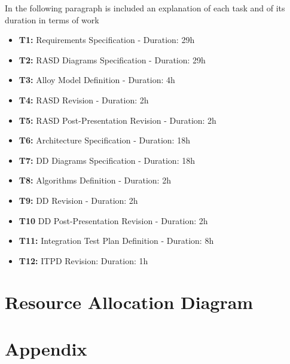 \documentclass[11pt,titlepage]{article} %
\begin{document}
In the following paragraph is included an explanation of each task and of its duration in terms of work
\begin{itemize}
 \item \textbf{T1:} Requirements Specification - Duration: 29h
 \item \textbf{T2:} RASD Diagrams Specification - Duration: 29h
 \item \textbf{T3:} Alloy Model Definition - Duration: 4h
 \item \textbf{T4:} RASD Revision - Duration: 2h
 \item \textbf{T5:} RASD Post-Presentation Revision - Duration: 2h
 \item \textbf{T6:} Architecture Specification - Duration: 18h
 \item \textbf{T7:} DD Diagrams Specification - Duration: 18h
 \item \textbf{T8:} Algorithms Definition - Duration: 2h
 \item \textbf{T9:} DD Revision - Duration: 2h
 \item \textbf{T10} DD Post-Presentation Revision - Duration: 2h
 \item \textbf{T11:} Integration Test Plan Definition - Duration: 8h
 \item \textbf{T12:} ITPD Revision: Duration: 1h
\end{itemize}

\newpage
\section{Resource Allocation Diagram}

\section{Appendix}
\end{document}

